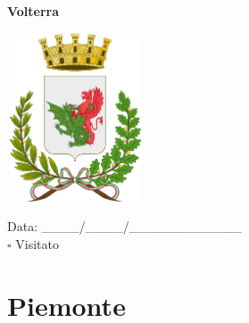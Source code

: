 \documentclass[a5paper,12pt]{article}
\begin{document}
\vspace{0.7cm}

\noindent
\begin{minipage}[t]{0.45\textwidth}
    \begin{center}
        \textbf{Volterra}
    \end{center}
    \vspace{-0.5cm} %
    \begin{center}
        \includegraphics[height= 5cm, width=4cm]{Toscana/Stemma Volterra.png}
    \end{center}
    \vspace{-0.4cm} %
    \begin{flushleft}
        Data: \_\_\_\_/\_\_\_\_/\_\_\_\_\_\_\_\_\_\_\_\_ \\
        $\square$ Visitato
    \end{flushleft}
\end{minipage}

\newpage

\section*{Piemonte}

\newpage
\end{document}
